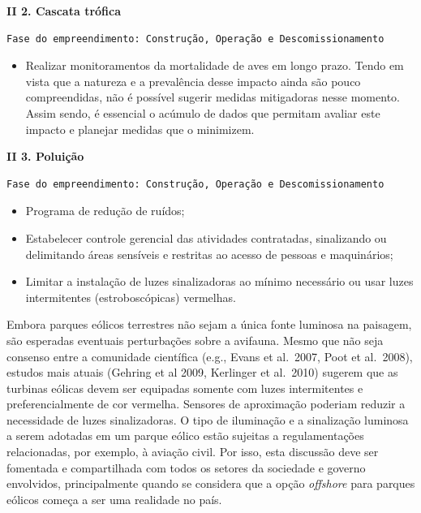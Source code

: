 \documentclass[
  oneside]{scrbook}
\providecommand{\tightlist}{%
  \setlength{\itemsep}{0pt}\setlength{\parskip}{0pt}}
\begin{document}
\textbf{II 2. Cascata trófica}

\begin{verbatim}
Fase do empreendimento: Construção, Operação e Descomissionamento  
\end{verbatim}

\begin{itemize}
\tightlist
\item
  Realizar monitoramentos da mortalidade de aves em longo prazo. Tendo em vista que a natureza e a prevalência desse impacto ainda são pouco compreendidas, não é possível sugerir medidas mitigadoras nesse momento. Assim sendo, é essencial o acúmulo de dados que permitam avaliar este impacto e planejar medidas que o minimizem.
\end{itemize}

\textbf{II 3. Poluição}

\begin{verbatim}
Fase do empreendimento: Construção, Operação e Descomissionamento  
\end{verbatim}

\begin{itemize}
\tightlist
\item
  Programa de redução de ruídos;
\item
  Estabelecer controle gerencial das atividades contratadas, sinalizando ou delimitando áreas sensíveis e restritas ao acesso de pessoas e maquinários;
\item
  Limitar a instalação de luzes sinalizadoras ao mínimo necessário ou usar luzes intermitentes (estroboscópicas) vermelhas.
\end{itemize}

Embora parques eólicos terrestres não sejam a única fonte luminosa na paisagem, são esperadas eventuais perturbações sobre a avifauna. Mesmo que não seja consenso entre a comunidade científica (e.g., Evans et al.~2007, Poot et al.~2008), estudos mais atuais (Gehring et al 2009, Kerlinger et al.~2010) sugerem que as turbinas eólicas devem ser equipadas somente com luzes intermitentes e preferencialmente de cor vermelha. Sensores de aproximação poderiam reduzir a necessidade de luzes sinalizadoras. O tipo de iluminação e a sinalização luminosa a serem adotadas em um parque eólico estão sujeitas a regulamentações relacionadas, por exemplo, à aviação civil. Por isso, esta discussão deve ser fomentada e compartilhada com todos os setores da sociedade e governo envolvidos, principalmente quando se considera que a opção \emph{offshore} para parques eólicos começa a ser uma realidade no país.
\end{document}
